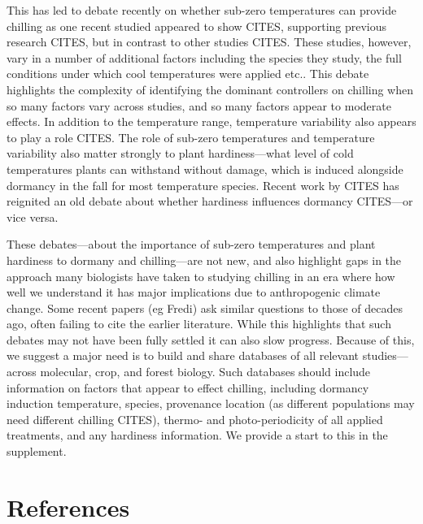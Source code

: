 \documentclass[11pt]{article}
\begin{document}
This has led to debate recently on whether sub-zero temperatures can provide chilling as one recent studied appeared to show CITES, supporting previous research CITES, but in contrast to other studies CITES. These studies, however, vary in a number of additional factors including the species they study, the full conditions under which cool temperatures were applied etc.. This debate highlights the complexity of identifying the dominant controllers on chilling when so many factors vary across studies, and so many factors appear to moderate effects. In addition to the temperature range, temperature variability also appears to play a role CITES. The role of sub-zero temperatures and temperature variability also matter strongly to plant hardiness---what level of cold temperatures plants can withstand without damage, which is induced alongside dormancy in the fall for most temperature species. Recent work by CITES has reignited an old debate about whether hardiness influences dormancy CITES---or vice versa. 

These debates---about the importance of sub-zero temperatures and plant hardiness to dormany and chilling---are not new, and also highlight gaps in the approach many biologists have taken to studying chilling in an era where how well we understand it has major implications due to anthropogenic climate change. Some recent papers (eg Fredi) ask similar questions to those of decades ago, often failing to cite the earlier literature. While this highlights that such debates may not have been fully settled it can also slow progress. Because of this, we suggest a major need is to build and share databases of all relevant studies---across molecular, crop, and forest biology. Such databases should include information on factors that appear to effect chilling, including dormancy induction temperature, species, provenance location (as different populations may need different chilling CITES), thermo- and photo-periodicity of all applied treatments, and any hardiness information. We provide a start to this in the supplement. %



\clearpage

\section{References}

\end{document}
